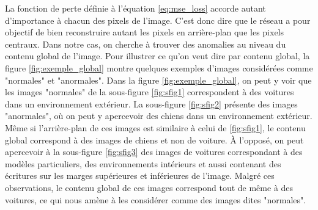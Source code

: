 La fonction de perte définie à l'équation \ref{eq:mse_loss} accorde autant d'importance à chacun des pixels de l'image. C'est donc dire que le réseau a pour objectif de bien reconstruire autant les pixels en arrière-plan que les pixels centraux. Dans notre cas,  on cherche à trouver des anomalies au niveau du contenu global de l'image. Pour illustrer ce qu'on veut dire par contenu global, la figure \ref{fig:exemple_global} montre quelques exemples d'images considérées comme "normales" et "anormales". Dans la figure \ref{fig:exemple_global}, on peut y voir que les images "normales" de la sous-figure \ref{fig:sfig1} correspondent à des voitures dans un environnement extérieur. La sous-figure \ref{fig:sfig2} présente des images "anormales", où on peut y apercevoir des chiens dans un environnement extérieur. Même si l'arrière-plan de ces images est similaire à celui de \ref{fig:sfig1}, le contenu global correspond à des images de chiens et non de voiture. À l'opposé, on peut apercevoir à la sous-figure \ref{fig:sfig3} des images de voitures correspondant à des modèles particuliers, des environnements intérieurs et aussi contenant des écritures sur les marges supérieures et inférieures de l'image. Malgré ces observations, le contenu global de ces images correspond tout de même à des voitures, ce qui nous amène à les considérer comme des images dites "normales".

